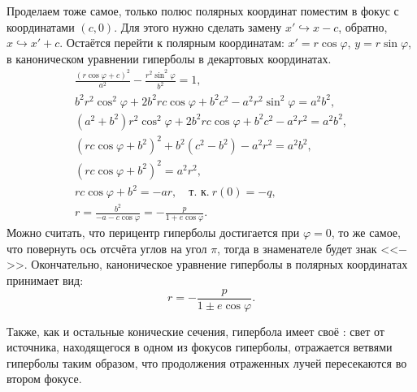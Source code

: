 Проделаем тоже самое, только полюс полярных координат поместим в фокус с координатами $(c,0)$. Для этого нужно сделать замену $x' \hookrightarrow x - c$, обратно, $x \hookrightarrow x' + c$. Остаётся перейти к полярным координатам: $x' = r \cos \varphi$, $y = r \sin \varphi$, в каноническом уравнении гиперболы в декартовых координатах.
\begin{gather*}
    \frac{(r \cos \varphi + c)^2}{a^2} - \frac{r^2 \sin^2 \varphi}{b^2} = 1,\\
     b^2 r^2 \cos^2 \varphi + 2 b^2 r c \cos \varphi + b^2 c^2 - a^2 r^2 \sin^2 \varphi = a^2 b^2,\\
     (a^2 + b^2) r^2 \cos^2 \varphi + 2 b^2 r c \cos \varphi + b^2 c^2 - a^2 r^2 = a^2 b^2,\\
    (rc\cos \varphi + b^2)^2 + b^2(c^2 - b^2) - a^2 r^2 = a^2 b^2,\\
    (rc\cos \varphi + b^2)^2 = a^2 r^2,\\
    rc\cos \varphi + b^2 = -a r,\quad\text{т. к.}~r(0) = -q,\\
    r = \frac{b^2}{-a - c \cos \varphi} = - \frac{p}{1 + e \cos \varphi}.
\end{gather*}
Можно считать, что перицентр гиперболы достигается при $\varphi = 0$, то же самое, что повернуть ось отсчёта углов на угол $\pi$, тогда в знаменателе будет знак <<$-$>>. Окончательно, каноническое уравнение гиперболы в полярных координатах принимает вид:
\begin{equation}
    r = -\frac{p}{1 \pm e \cos \varphi}.
\end{equation}

Также, как и остальные конические сечения, гипербола имеет своё : свет от источника, находящегося в одном из фокусов гиперболы, отражается ветвями гиперболы таким образом, что продолжения отраженных лучей пересекаются во втором фокусе.

